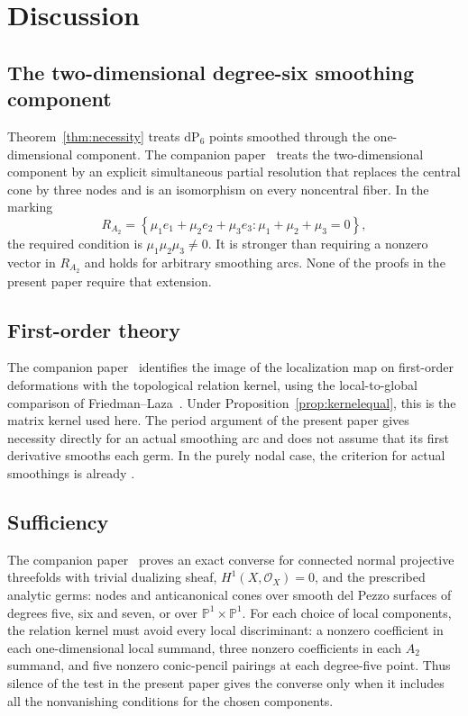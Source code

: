 \documentclass[11pt]{amsart}
\theoremstyle{definition}
\theoremstyle{remark}
\theoremstyle{plain}
\newcommand{\PP}{\mathbb{P}}
\newcommand{\cO}{\mathcal{O}}
\newcommand{\dP}{\mathrm{dP}}
\begin{document}
\section{Discussion}\label{sec:discussion}

\subsection{The two-dimensional degree-six smoothing component}\label{sec:open}
Theorem~\ref{thm:necessity} treats $\dP_6$ points smoothed through
the one-dimensional component.  The companion paper~\cite{PaperV}
treats the two-dimensional component by an explicit simultaneous partial
resolution that replaces the central cone by three nodes and is an
isomorphism on every noncentral fiber.  In the marking
\[
R_{A_2}=\left\{\mu_1e_1+\mu_2e_2+\mu_3e_3:
\mu_1+\mu_2+\mu_3=0\right\},
\]
the required condition is $\mu_1\mu_2\mu_3\ne0$.
It is stronger than requiring a nonzero vector in $R_{A_2}$ and holds
for arbitrary smoothing arcs.  None of the proofs in the present
paper require that extension.

\subsection{First-order theory}
The companion paper~\cite{PaperV} identifies the image of the
localization map on first-order deformations with the topological
relation kernel, using the local-to-global comparison of
Friedman--Laza~\cite{FL22a}.  Under
Proposition~\ref{prop:kernelequal}, this is the matrix kernel used here.
The period argument of the present paper gives necessity directly for
an actual smoothing arc and does not assume that its first derivative
smooths each germ.  In the purely nodal case, the criterion for actual
smoothings is already \cite[Thm.~1.3]{RT09}.

\subsection{Sufficiency}\label{sec:sufficiency}
The companion paper~\cite[Thms.~A--B]{PaperV} proves an exact
converse for connected normal projective threefolds with trivial
dualizing sheaf, $H^1(X,\cO_X)=0$, and the prescribed analytic germs:
nodes and anticanonical cones over smooth del Pezzo surfaces of degrees
five, six and seven, or over $\PP^1\times\PP^1$.
For each choice of local components, the relation kernel must avoid
every local discriminant: a nonzero coefficient in each one-dimensional
local summand, three nonzero coefficients in each $A_2$ summand, and five
nonzero conic-pencil pairings at each degree-five point.
Thus silence of the test in the present paper gives the converse only
when it includes all the nonvanishing conditions for the chosen
components.
\end{document}
